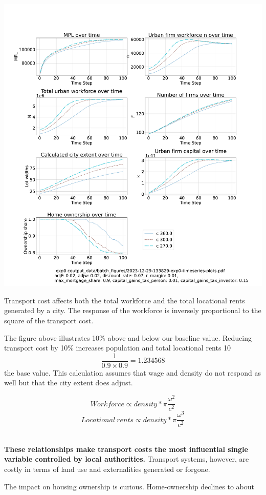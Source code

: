  \hspace{-2.5cm}\includegraphics[trim= 1.5cm 3.65cm 2cm 4.0cm, clip, scale=.28]{fig/Analysis/Changing_Transport-cost2.pdf}

Transport cost affects both the total workforce and the total locational rents generated by a city. The response of the workforce is inversely proportional to the square of the transport cost.  

The figure above illustrates 10\% above and below our baseline value.  Reducing transport cost by 10\% increases population and total locational rents 10 \[\frac{1}{0.9 \times 0.9}=1.234568\]
the base value. This calculation assumes that wage and density do not respond as well but that the city extent does adjust.

\[Workforce\propto density * \pi \frac{\omega^2}{c^2}\]
\[Locational\ rents\propto density * \pi \frac{\omega^3}{c^2}\]\

\textbf{These relationships make transport costs the most influential single variable controlled by local authorities.} Transport systems, however, are costly in terms of land use and externalities generated or forgone.

The impact on housing ownership is curious. Home-ownership declines to about 



